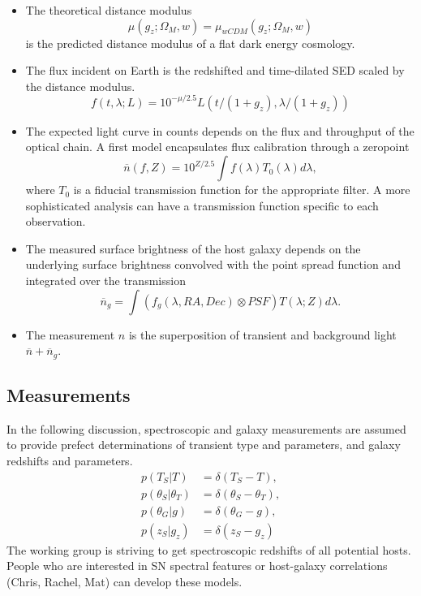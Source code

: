\documentclass[preprint,3p]{elsarticle}
\begin{document}
\begin{itemize}
{\bf The non-Ia model needs to be identified.}
\item The theoretical distance modulus
\begin{equation}
\mu(g_z; \Omega_M, w) = \mu_{wCDM}(g_z; \Omega_M, w)
\end{equation}
is the predicted distance modulus of a flat dark energy cosmology.
\item The flux incident on Earth is the redshifted and time-dilated SED scaled
by the distance modulus.
\begin{equation}
f(t,\lambda; L) = 10^{-\mu/2.5} L\left(t/(1+g_z),\lambda/(1+g_z)\right)
\end{equation}
\item The expected light curve in counts depends on the flux and throughput of the
optical chain.  A first model encapsulates flux calibration through a zeropoint
\begin{equation}
\overline{n}(f, Z) = 10^{Z/2.5} \int  f(\lambda) T_0(\lambda)d\lambda,
\end{equation}
where $T_0$ is a fiducial transmission function for the appropriate filter.  A more sophisticated
analysis can have a transmission function specific to each observation.
\item The measured surface brightness of the host galaxy depends on the underlying
surface brightness convolved with the point spread function and integrated
over the transmission
\begin{equation}
\overline{n}_g =    \int (f_g(\lambda, RA, Dec) \otimes PSF) T(\lambda;Z)d\lambda.
\end{equation}
\item The measurement $n$ is the superposition of transient and background
light $\overline{n} + \overline{n}_g$.
\end{itemize}

\subsection{Measurements}
\label{measurements:sec}
In the following discussion,
spectroscopic and galaxy measurements are assumed
to provide prefect determinations of transient type and parameters, and
galaxy redshifts and parameters. 
\begin{align}
p(T_S|T) &= \delta(T_S-T),\\
p(\theta_S|\theta_T) &= \delta(\theta_S-\theta_T),\\
p(\theta_G|g) &= \delta(\theta_G-g),\\
p(z_S|g_z) &= \delta(z_S-g_z)
\label{specz:eqn}
\end{align}
The working group is striving to get spectroscopic
redshifts of all potential hosts.  People who are interested in SN spectral features
or host-galaxy correlations (Chris, Rachel, Mat) can develop these models.
\end{document}
